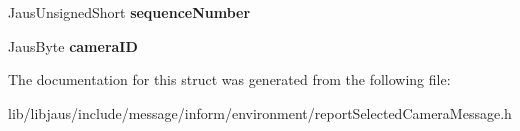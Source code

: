 \begin{DoxyCompactItemize}
\item 
\hypertarget{struct_report_selected_camera_message_struct_a5d984c2aef7468d70adf6edbaada686f}{\-Jaus\-Unsigned\-Short {\bfseries sequence\-Number}}\label{struct_report_selected_camera_message_struct_a5d984c2aef7468d70adf6edbaada686f}

\item 
\hypertarget{struct_report_selected_camera_message_struct_a1976377a99c679d0be344fa9e9cd343d}{\-Jaus\-Byte {\bfseries camera\-I\-D}}\label{struct_report_selected_camera_message_struct_a1976377a99c679d0be344fa9e9cd343d}

\end{DoxyCompactItemize}


\-The documentation for this struct was generated from the following file\-:\begin{DoxyCompactItemize}
\item 
lib/libjaus/include/message/inform/environment/report\-Selected\-Camera\-Message.\-h\end{DoxyCompactItemize}
